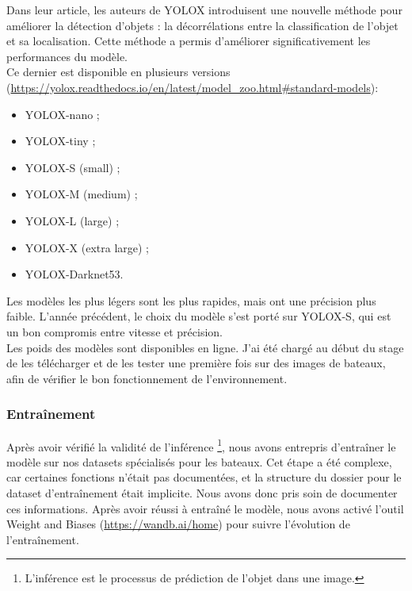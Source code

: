 Dans leur article, les auteurs de YOLOX \cite{Ge_Liu_Wang_Li_Sun_2021} introduisent une nouvelle méthode
pour améliorer la détection d'objets : la décorrélations entre la classification de l'objet et 
sa localisation. Cette méthode a permis d'améliorer significativement les performances du modèle.\\

Ce dernier est disponible en plusieurs versions (\url{https://yolox.readthedocs.io/en/latest/model_zoo.html#standard-models}): 
\begin{itemize}
    \item YOLOX-nano ;
    \item YOLOX-tiny ;
    \item YOLOX-S (small) ;
    \item YOLOX-M (medium) ;
    \item YOLOX-L (large) ;
    \item YOLOX-X (extra large) ;
    \item YOLOX-Darknet53.
\end{itemize}

Les modèles les plus légers sont les plus rapides, mais ont une précision plus faible.
L'année précédent, le choix du modèle s'est porté sur YOLOX-S, qui est un bon compromis entre
vitesse et précision.\\

Les poids des modèles sont disponibles en ligne. J'ai été chargé au début du stage de les 
télécharger et de les tester une première fois sur des images de bateaux, afin de vérifier
le bon fonctionnement de l'environnement.\\

\subsubsection{Entraînement}

Après avoir vérifié la validité de l'inférence \footnote{L'inférence est le processus de prédiction
de l'objet dans une image.}, nous avons entrepris d'entraîner le modèle sur nos datasets spécialisés pour 
les bateaux. Cet étape a été complexe, car certaines fonctions n'était pas documentées, et 
la structure du dossier pour le dataset d'entraînement était implicite. Nous avons donc pris soin de documenter
ces informations. Après avoir réussi à entraîné le modèle, nous avons activé l'outil 
Weight and Biases (\url{https://wandb.ai/home}) pour suivre l'évolution de l'entraînement.\\

